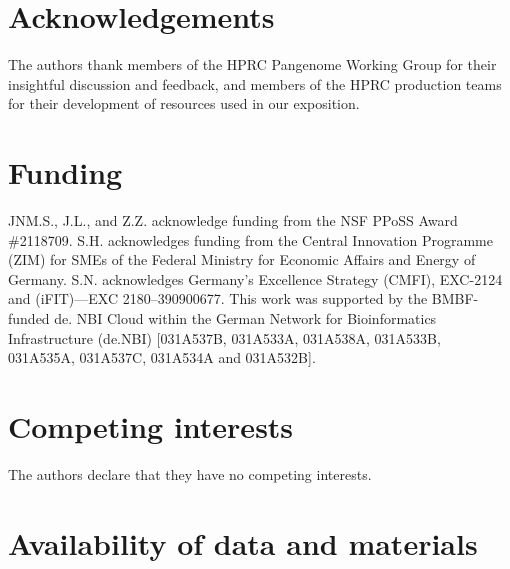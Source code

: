\documentclass[11pt,hidelinks]{article}
\begin{document}



\section*{Acknowledgements}
The authors thank members of the HPRC Pangenome Working Group for their insightful discussion and feedback, and members of the HPRC production teams for their development of resources used in our exposition.

\section*{Funding}
JNM.S., J.L., and Z.Z. acknowledge funding from the NSF PPoSS Award \#2118709.
S.H. acknowledges funding from the Central Innovation Programme (ZIM) for SMEs of the Federal Ministry for Economic Affairs and Energy of Germany. S.N. acknowledges Germany’s Excellence Strategy (CMFI), EXC-2124 and (iFIT)—EXC 2180–390900677. This work was supported by the BMBF-funded de. NBI Cloud within the German Network for Bioinformatics Infrastructure (de.NBI) [031A537B, 031A533A, 031A538A, 031A533B, 031A535A, 031A537C, 031A534A and 031A532B].

\section*{Competing interests}
The authors declare that they have no competing interests.

\section*{Availability of data and materials}
\end{document}
